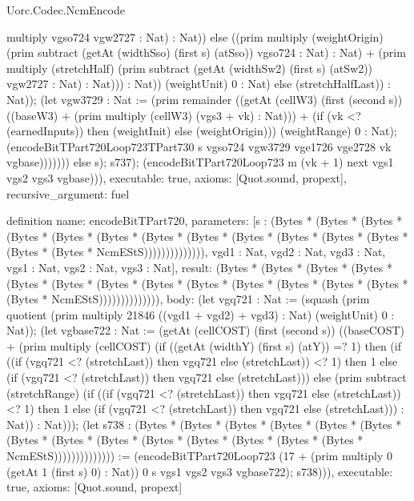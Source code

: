 \begin{lexlean}{Uorc.Codec.NcmEncode}
\begin{semanticmodule}
{multiply vgso724 vgw2727 : Nat) : Nat)) else ((prim multiply (weightOrigin) (prim subtract (getAt (widthSso) (first s) (atSso)) vgso724 : Nat) : Nat) + (prim multiply (stretchHalf) (prim subtract (getAt (widthSw2) (first s) (atSw2)) vgw2727 : Nat) : Nat))) : Nat)) (weightUnit) 0 : Nat) else (stretchHalfLast)) : Nat)); (let vgw3729 : Nat := (prim remainder ((getAt (cellW3) (first (second s)) ((baseW3) + (prim multiply (cellW3) (vgs3 + vk) : Nat))) + (if (vk <? (earnedInputs)) then (weightInit) else (weightOrigin))) (weightRange) 0 : Nat); (encodeBitTPart720Loop723TPart730 s vgso724 vgw3729 vge1726 vge2728 vk vgbase))))))) else s); s737); (encodeBitTPart720Loop723 m (vk + 1) next vgs1 vgs2 vgs3 vgbase))),
  executable: true,
  axioms: [Quot.sound, propext],
  recursive_argument: fuel
}

definition{
  name: encodeBitTPart720,
  parameters: [s : (Bytes * (Bytes * (Bytes * (Bytes * (Bytes * (Bytes * (Bytes * (Bytes * (Bytes * (Bytes * (Bytes * (Bytes * (Bytes * (Bytes * NcmEStS)))))))))))))), vgd1 : Nat, vgd2 : Nat, vgd3 : Nat, vgs1 : Nat, vgs2 : Nat, vgs3 : Nat],
  result: (Bytes * (Bytes * (Bytes * (Bytes * (Bytes * (Bytes * (Bytes * (Bytes * (Bytes * (Bytes * (Bytes * (Bytes * (Bytes * (Bytes * NcmEStS)))))))))))))),
  body: (let vgq721 : Nat := (squash (prim quotient (prim multiply 21846 ((vgd1 + vgd2) + vgd3) : Nat) (weightUnit) 0 : Nat)); (let vgbase722 : Nat := (getAt (cellCOST) (first (second s)) ((baseCOST) + (prim multiply (cellCOST) (if ((getAt (widthY) (first s) (atY)) =? 1) then (if ((if (vgq721 <? (stretchLast)) then vgq721 else (stretchLast)) <? 1) then 1 else (if (vgq721 <? (stretchLast)) then vgq721 else (stretchLast))) else (prim subtract (stretchRange) (if ((if (vgq721 <? (stretchLast)) then vgq721 else (stretchLast)) <? 1) then 1 else (if (vgq721 <? (stretchLast)) then vgq721 else (stretchLast))) : Nat)) : Nat))); (let s738 : (Bytes * (Bytes * (Bytes * (Bytes * (Bytes * (Bytes * (Bytes * (Bytes * (Bytes * (Bytes * (Bytes * (Bytes * (Bytes * (Bytes * NcmEStS)))))))))))))) := (encodeBitTPart720Loop723 (17 + (prim multiply 0 (getAt 1 (first s) 0) : Nat)) 0 s vgs1 vgs2 vgs3 vgbase722); s738))),
  executable: true,
  axioms: [Quot.sound, propext]
}


\end{semanticmodule}
\end{lexlean}
